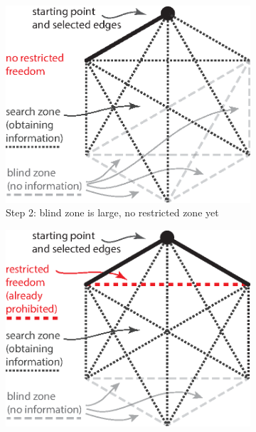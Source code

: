 \begin{figure}[th!]
        \centering
        \begin{subfigure}[b]{.48\textwidth}
            \includegraphics[width=\linewidth]{figures/ch_introduction/mst_illustration_0}
            \caption{Step 2: blind zone is large, no restricted zone yet}
            \label{fig:mst_illustration-0}
        \end{subfigure}
        \hfill
        \begin{subfigure}[b]{.48\textwidth}
            \includegraphics[width=\linewidth]{figures/ch_introduction/mst_illustration_1}

\end{subfigure}
\end{figure}
